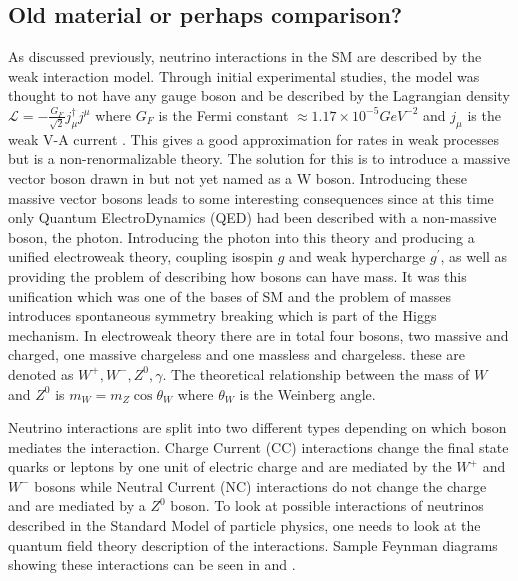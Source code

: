 \subsection{Old material or perhaps comparison?}
As discussed previously, neutrino interactions in the SM are described by the weak interaction model. Through initial experimental studies, the model was thought to not have any gauge boson and be described by the Lagrangian density $\mathscr{L} = -\frac{G_F}{\sqrt{2}} j_\mu ^\dagger j^\mu$ where $G_F$ is the Fermi constant $\approx 1.17 \times 10^{-5} GeV^{-2}$ and $j_\mu$ is the weak V-A current \cite{47Soler}. This gives a good approximation for rates in weak processes but is a non-renormalizable theory. The solution for this is to introduce a massive vector boson drawn in  but not yet named as a W boson. Introducing these massive vector bosons leads to some interesting consequences since at this time only Quantum ElectroDynamics (QED) had been described with a non-massive boson, the photon. Introducing the photon into this theory and producing a unified electroweak theory, coupling isospin $g$ and weak hypercharge $g^\prime$, as well as providing the problem of describing how bosons can have mass. It was this unification which was one of the bases of SM and the problem of masses introduces spontaneous symmetry breaking which is part of the Higgs mechanism. In electroweak theory there are in total four bosons, two massive and charged, one massive chargeless and one massless and chargeless. these are denoted as $W^+, W^-, Z^0, \gamma$. The theoretical relationship between the mass of $W$ and $Z^0$ is $m_W = m_Z \cos \theta_W$ where $\theta_W$ is the Weinberg angle.

Neutrino interactions are split into two different types depending on which boson mediates the interaction.
Charge Current (CC) interactions change the final state quarks or leptons by one unit of electric charge and are mediated by the $W^+$ and $W^-$ bosons while Neutral Current (NC) interactions do not change the charge and are mediated by a $Z^0$ boson. 
To look at possible interactions of neutrinos described in the Standard Model of particle physics, one needs to look at the quantum field theory description of the interactions\cite{3Peskin, 2Hallsjo}. Sample Feynman diagrams showing these interactions can be seen in  and .

